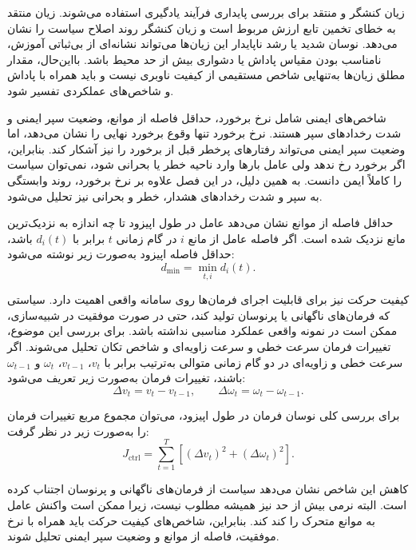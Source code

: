 زیان کنشگر و منتقد برای بررسی پایداری فرآیند یادگیری استفاده می‌شوند. زیان منتقد به خطای تخمین تابع ارزش مربوط است و زیان کنشگر روند اصلاح سیاست را نشان می‌دهد. نوسان شدید یا رشد ناپایدار این زیان‌ها می‌تواند نشانه‌ای از بی‌ثباتی آموزش، نامناسب بودن مقیاس پاداش یا دشواری بیش از حد محیط باشد. بااین‌حال، مقدار مطلق زیان‌ها به‌تنهایی شاخص مستقیمی از کیفیت ناوبری نیست و باید همراه با پاداش و شاخص‌های عملکردی تفسیر شود.

شاخص‌های ایمنی شامل نرخ برخورد، حداقل فاصله از موانع، وضعیت سپر ایمنی و شدت رخدادهای سپر هستند. نرخ برخورد تنها وقوع برخورد نهایی را نشان می‌دهد، اما وضعیت سپر ایمنی می‌تواند رفتارهای پرخطر قبل از برخورد را نیز آشکار کند. بنابراین، اگر برخورد رخ ندهد ولی عامل بارها وارد ناحیه خطر یا بحرانی شود، نمی‌توان سیاست را کاملاً ایمن دانست. به همین دلیل، در این فصل علاوه بر نرخ برخورد، روند وابستگی به سپر و شدت رخدادهای هشدار، خطر و بحرانی نیز تحلیل می‌شود.

حداقل فاصله از موانع نشان می‌دهد عامل در طول اپیزود تا چه اندازه به نزدیک‌ترین مانع نزدیک شده است. اگر فاصله عامل از مانع \(i\) در گام زمانی \(t\) برابر با \(d_i(t)\) باشد، حداقل فاصله اپیزود به‌صورت زیر نوشته می‌شود:
\begin{equation}
	d_{\min} = \min_{t,i} d_i(t).
	\label{eq:min_obstacle_distance_definition}
\end{equation}

کیفیت حرکت نیز برای قابلیت اجرای فرمان‌ها روی سامانه واقعی اهمیت دارد. سیاستی که فرمان‌های ناگهانی یا پرنوسان تولید کند، حتی در صورت موفقیت در شبیه‌سازی، ممکن است در نمونه واقعی عملکرد مناسبی نداشته باشد. برای بررسی این موضوع، تغییرات فرمان سرعت خطی و سرعت زاویه‌ای و شاخص تکان  تحلیل می‌شوند. اگر سرعت خطی و زاویه‌ای در دو گام زمانی متوالی به‌ترتیب برابر با \(v_t\)، \(v_{t-1}\)، \(\omega_t\) و \(\omega_{t-1}\) باشند، تغییرات فرمان به‌صورت زیر تعریف می‌شود:
\begin{equation}
	\Delta v_t = v_t - v_{t-1},
	\qquad
	\Delta \omega_t = \omega_t - \omega_{t-1}.
	\label{eq:control_variation_definition}
\end{equation}

برای بررسی کلی نوسان فرمان در طول اپیزود، می‌توان مجموع مربع تغییرات فرمان را به‌صورت زیر در نظر گرفت:
\begin{equation}
	J_{\mathrm{ctrl}} =
	\sum_{t=1}^{T}
	\left[
	(\Delta v_t)^2 +
	(\Delta \omega_t)^2
	\right].
	\label{eq:control_smoothness_definition}
\end{equation}

کاهش این شاخص نشان می‌دهد سیاست از فرمان‌های ناگهانی و پرنوسان اجتناب کرده است. البته نرمی بیش از حد نیز همیشه مطلوب نیست، زیرا ممکن است واکنش عامل به موانع متحرک را کند کند. بنابراین، شاخص‌های کیفیت حرکت باید همراه با نرخ موفقیت، فاصله از موانع و وضعیت سپر ایمنی تحلیل شوند.

